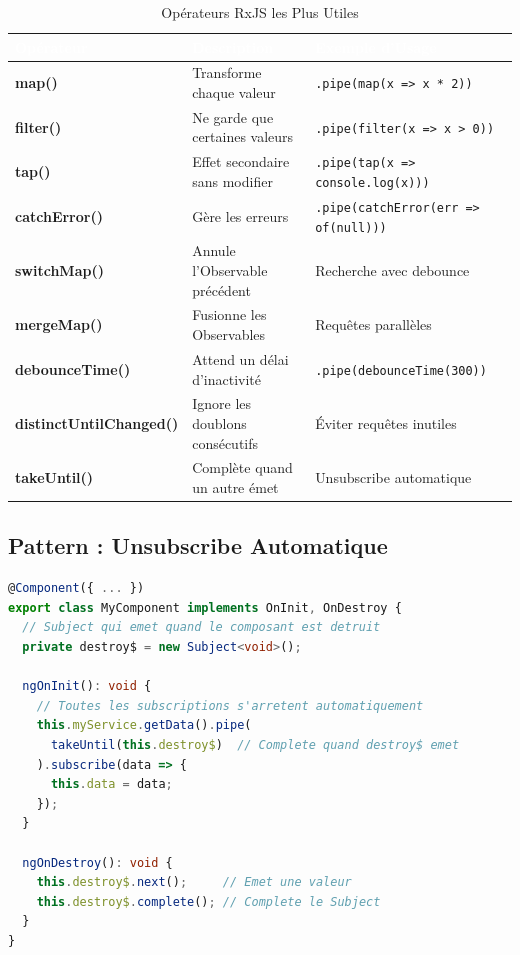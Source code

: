 \documentclass[12pt,a4paper]{article}
\begin{document}
\begin{table}[H]
\centering
\small
{}
\begin{tabular}{|>{\bfseries}p{2.5cm}|p{5cm}|p{6cm}|}
\hline
\rowcolor{angularred}
\textcolor{white}{\textbf{Opérateur}} & \textcolor{white}{\textbf{Description}} & \textcolor{white}{\textbf{Exemple d'Usage}} \\
\hline
map() & Transforme chaque valeur & \texttt{.pipe(map(x => x * 2))} \\
\hline
filter() & Ne garde que certaines valeurs & \texttt{.pipe(filter(x => x > 0))} \\
\hline
tap() & Effet secondaire sans modifier & \texttt{.pipe(tap(x => console.log(x)))} \\
\hline
catchError() & Gère les erreurs & \texttt{.pipe(catchError(err => of(null)))} \\
\hline
switchMap() & Annule l'Observable précédent & Recherche avec debounce \\
\hline
mergeMap() & Fusionne les Observables & Requêtes parallèles \\
\hline
debounceTime() & Attend un délai d'inactivité & \texttt{.pipe(debounceTime(300))} \\
\hline
distinctUntilChanged() & Ignore les doublons consécutifs & Éviter requêtes inutiles \\
\hline
takeUntil() & Complète quand un autre émet & Unsubscribe automatique \\
\hline
\end{tabular}
\caption{Opérateurs RxJS les Plus Utiles}
\end{table}

\subsection{Pattern : Unsubscribe Automatique}

\begin{lstlisting}[language=TypeScript, caption=Éviter les memory leaks avec takeUntil]
@Component({ ... })
export class MyComponent implements OnInit, OnDestroy {
  // Subject qui emet quand le composant est detruit
  private destroy$ = new Subject<void>();

  ngOnInit(): void {
    // Toutes les subscriptions s'arretent automatiquement
    this.myService.getData().pipe(
      takeUntil(this.destroy$)  // Complete quand destroy$ emet
    ).subscribe(data => {
      this.data = data;
    });
  }

  ngOnDestroy(): void {
    this.destroy$.next();     // Emet une valeur
    this.destroy$.complete(); // Complete le Subject
  }
}
\end{lstlisting}
\end{document}
